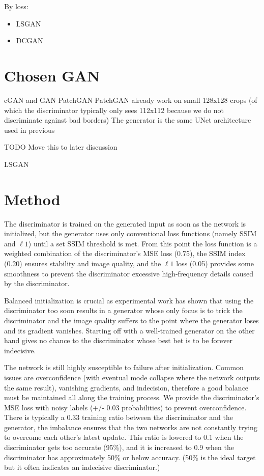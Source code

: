 By loss:
\begin{itemize}
\item \ac{LSGAN}
\item \ac{DCGAN}
\end{itemize}
\section{Chosen GAN}

cGAN and GAN
PatchGAN
PatchGAN  already work on small 128x128 crops (of which the discriminator typically only sees 112x112 because we do not discriminate against bad borders)
The generator is the same UNet architecture used in previous

TODO Move this to later discussion

LSGAN
\section{Method}
The discriminator is trained on the generated input as soon as the network is initialized, but the generator uses only conventional loss functions (namely \ac{SSIM} and $\ell 1$) until a set \ac{SSIM} threshold is met. From this point the loss function is a weighted combination of the discriminator's \ac{MSE} loss (0.75), the \ac{SSIM} index (0.20) ensures stability and image quality, and the $\ell 1$ loss (0.05) provides some smoothness to prevent the discriminator excessive high-frequency details caused by the discriminator. 

Balanced initialization is crucial as experimental work has shown that using the discriminator too soon results in a generator whose only focus is to trick the discriminator and the image quality suffers to the point where the generator loses and its gradient vanishes. Starting off with a well-trained generator on the other hand gives no chance to the discriminator whose best bet is to be forever indecisive.

The network is still highly susceptible to failure after initialization. Common issues are overconfidence (with eventual mode collapse where the network outputs the same result), vanishing gradients, and indecision, therefore a good balance must be maintained all along the training process. We provide the discriminator's \ac{MSE} loss with noisy labels (+/- 0.03 probabilities) to prevent overconfidence. There is typically a 0.33 training ratio between the discriminator and the generator, the imbalance ensures that the two networks are not constantly trying to overcome each other's latest update. This ratio is lowered to 0.1 when the discriminator gets too accurate (95\%), and it is increased to 0.9 when the discriminator has approximately 50\% or below accuracy. (50\% is the ideal target but it often indicates an indecisive discriminator.)

